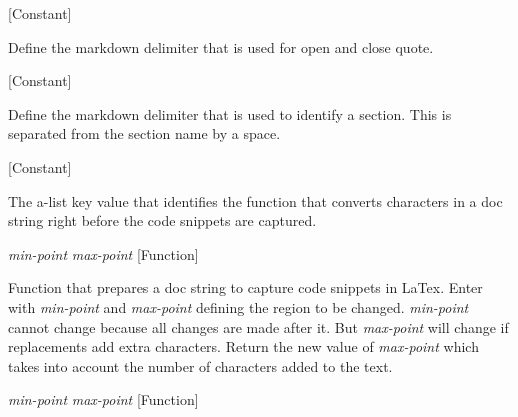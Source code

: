 \vspace{1em}
\noindent
{}
\usebox{\funcname}
 \hfill [Constant]

\begin{doc-string}
Define the markdown delimiter that is used for open and close quote.
\end{doc-string}

\vspace{1em}
\noindent
{}
\usebox{\funcname}
 \hfill [Constant]

\begin{doc-string}
Define the markdown delimiter that is used to identify a section.  This is separated
from the section name by a space.
\end{doc-string}

\vspace{1em}
\noindent
{}
\usebox{\funcname}
 \hfill [Constant]

\begin{doc-string}
The a-list key value that identifies the function that converts characters in a
doc string right before the code snippets are captured.
\end{doc-string}

\vspace{1em}
\noindent
{}
\usebox{\funcname}\emph{min-point} \emph{max-point}
 \hfill [Function]

\begin{doc-string}
Function that prepares a doc string to capture code snippets in LaTex.
Enter with \emph{min-point} and \emph{max-point} defining the region to be changed.
\emph{min-point} cannot change because all changes are made after it.  But
\emph{max-point} will change if replacements add extra characters.  Return the
new value of \emph{max-point} which takes into account the number of characters
added to the text.
\end{doc-string}

\vspace{1em}
\noindent
{}
\usebox{\funcname}\emph{min-point} \emph{max-point}
 \hfill [Function]

